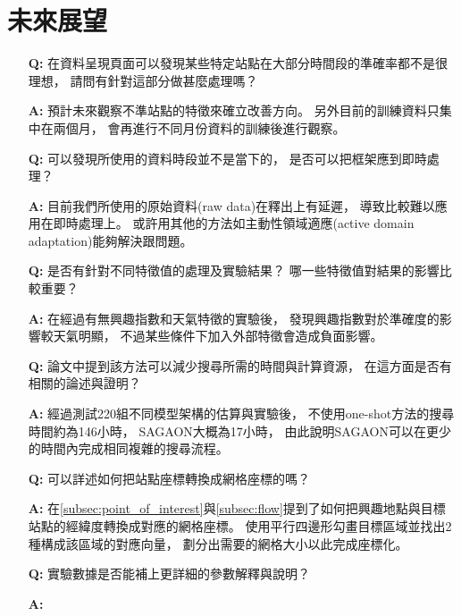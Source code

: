 \documentclass[a4paper,14pt]{extarticle}
\begin{document}
    \newpage
    \section{未來展望}
        \begin{itemize}
            \item [\textbf{Q:}]
            在資料呈現頁面可以發現某些特定站點在大部分時間段的準確率都不是很理想，
            請問有針對這部分做甚麼處理嗎？
            \item [\textbf{A:}]
            預計未來觀察不準站點的特徵來確立改善方向。
            另外目前的訓練資料只集中在兩個月，
            會再進行不同月份資料的訓練後進行觀察。
            \item [\textbf{Q:}]
            可以發現所使用的資料時段並不是當下的，
            是否可以把框架應到即時處理？
            \item [\textbf{A:}]
            目前我們所使用的原始資料(raw data)在釋出上有延遲，
            導致比較難以應用在即時處理上。
            或許用其他的方法如主動性領域適應(active domain adaptation)能夠解決跟問題。
            \item [\textbf{Q:}]
            是否有針對不同特徵值的處理及實驗結果？
            哪一些特徵值對結果的影響比較重要？
            \item [\textbf{A:}]
            在經過有無興趣指數和天氣特徵的實驗後，
            發現興趣指數對於準確度的影響較天氣明顯，
            不過某些條件下加入外部特徵會造成負面影響。
            \item [\textbf{Q:}]
            論文中提到該方法可以減少搜尋所需的時間與計算資源，
            在這方面是否有相關的論述與證明？
            \item [\textbf{A:}]
            經過測試220組不同模型架構的估算與實驗後，
            不使用one-shot方法的搜尋時間約為146小時，
            SAGAON大概為17小時，
            由此說明SAGAON可以在更少的時間內完成相同複雜的搜尋流程。
            \item [\textbf{Q:}]
            可以詳述如何把站點座標轉換成網格座標的嗎？
            \item [\textbf{A:}]
            在\ref{subsec:point_of_interest}與\ref{subsec:flow}提到了如何把興趣地點與目標站點的經緯度轉換成對應的網格座標。
            使用平行四邊形勾畫目標區域並找出2種構成該區域的對應向量，
            劃分出需要的網格大小以此完成座標化。
            \item [\textbf{Q:}]
            實驗數據是否能補上更詳細的參數解釋與說明？
            \item [\textbf{A:}]

\end{itemize}
\end{document}
